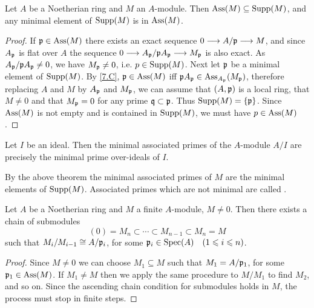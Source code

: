 \documentclass[../main]{subfiles}
\begin{document}
\begin{partheorem}\label{thm:009}
Let $A$ be a Noetherian ring and $M$ an $A$-module. Then $\operatorname{Ass}(M)\subseteq\operatorname{Supp}(M)$, and any minimal element
of $\operatorname{Supp}(M)$ is in $\operatorname{Ass}(M)$.
\end{partheorem}
\begin{proof}
If $\mathfrak{p}\in\operatorname{Ass}(M)$ there exists an exact sequence $0\longrightarrow A/\mathfrak{p}\longrightarrow M$, and since $A_{\mathfrak{p}}$ is flat over $A$ the sequence $0\longrightarrow A_{\mathfrak{p}}/\mathfrak{p}A_{\mathfrak{p}}\longrightarrow M_{\mathfrak{p}}$ is also exact. As $A_{\mathfrak{p}}/\mathfrak{p}A_{\mathfrak{p}}\neq0$, we have $M_{\mathfrak{p}}\neq0$, i.e. $p\in\operatorname{Supp}(M)$. Next let $\mathfrak{p}$ be a minimal element of $\operatorname{Supp}(M)$. By \ref{7.C}, $\mathfrak{p}\in\operatorname{Ass}(M)$ iff $\mathfrak{p}A_{\mathfrak{p}}\in\operatorname{Ass}_{A_{\mathfrak{p}}}(M_{\mathfrak{p}})$, therefore replacing $A$ and $M$ by $A_{\mathfrak{p}}$ and $M_{\mathfrak{p}}$, we can assume that $(A,\mathfrak{p})$ is a local ring, that $M\neq 0$ and that $M_{\mathfrak{p}}=0$ for any prime $\mathfrak{q}\subset\mathfrak{p}$. Thus $\operatorname{Supp}(M)=\{\mathfrak{p}\}$. Since $\operatorname{Ass}(M)$ is not empty and is contained in $\operatorname{Supp}(M)$, we must have $p\in\operatorname{Ass}(M)$.
\end{proof}

\begin{corollary}\label{cor:07.03}
Let $I$ be an ideal. Then the minimal associated primes of the $A$-module $A/I$ are precisely the minimal prime over-ideals of $I$.
\end{corollary}

\begin{remark}
By the above theorem the minimal associated primes of $M$ are the minimal elements of $\operatorname{Supp}(M)$. Associated primes which are not minimal are called .
\end{remark}

\begin{partheorem}\label{thm:010}
Let $A$ be a Noetherian ring and $M$ a finite $A$-module, $M\neq0$. Then there exists a chain of submodules \[(0)=M_n\subset\cdots\subset M_{n-1}\subset M_n=M\] such that $M_i/M_{i-1}\cong A/\mathfrak{p}_i$, for some $\ideal{p}_i\in\Spec(A)\for{1\leqslant i\leqslant n}$.
\end{partheorem}

\begin{proof}
Since $M\neq0$ we can choose $M_1\subseteq M$ such that $M_1=A/\mathfrak{p}_1$, for some $\mathfrak{p}_1\in\operatorname{Ass}(M)$. If $M_1\neq M$ then we apply the same procedure to $M/M_1$ to find $M_2$, and so on. Since the ascending chain condition for submodules holds in $M$, the process must stop in finite steps.
\end{proof}
\end{document}
